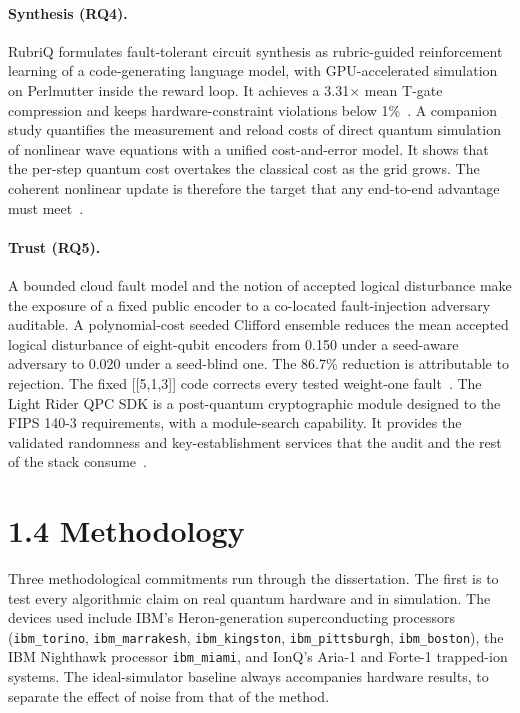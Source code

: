 \documentclass{report}
\theoremstyle{plain}
\theoremstyle{definition}
\theoremstyle{remark}
\begin{document}
\paragraph{Synthesis (RQ4).}
RubriQ formulates fault-tolerant circuit synthesis as rubric-guided reinforcement learning of a code-generating language model, with GPU-accelerated simulation on Perlmutter inside the reward loop. It achieves a 3.31$\times$ mean T-gate compression and keeps hardware-constraint violations below 1\%~\cite{guo2026rubriq}. A companion study quantifies the measurement and reload costs of direct quantum simulation of nonlinear wave equations with a unified cost-and-error model. It shows that the per-step quantum cost overtakes the classical cost as the grid grows. The coherent nonlinear update is therefore the target that any end-to-end advantage must meet~\cite{guo2026nonlinearwaves}.

\paragraph{Trust (RQ5).}
A bounded cloud fault model and the notion of accepted logical disturbance make the exposure of a fixed public encoder to a co-located fault-injection adversary auditable. A polynomial-cost seeded Clifford ensemble reduces the mean accepted logical disturbance of eight-qubit encoders from 0.150 under a seed-aware adversary to 0.020 under a seed-blind one. The 86.7\% reduction is attributable to rejection. The fixed [[5,1,3]] code corrects every tested weight-one fault~\cite{guo2026qecaudit}. The Light Rider QPC SDK is a post-quantum cryptographic module designed to the FIPS 140-3 requirements, with a module-search capability. It provides the validated randomness and key-establishment services that the audit and the rest of the stack consume~\cite{guo2026lightriderqpc}.


\section{1.4 Methodology}\label{sec:intro:method}

Three methodological commitments run through the dissertation. The first is to test every algorithmic claim on real quantum hardware and in simulation. The devices used include IBM's Heron-generation superconducting processors (\texttt{ibm\_torino}, \texttt{ibm\_marrakesh}, \texttt{ibm\_kingston}, \texttt{ibm\_pittsburgh}, \texttt{ibm\_boston}), the IBM Nighthawk processor \texttt{ibm\_miami}, and IonQ's Aria-1 and Forte-1 trapped-ion systems. The ideal-simulator baseline always accompanies hardware results, to separate the effect of noise from that of the method.
\end{document}
